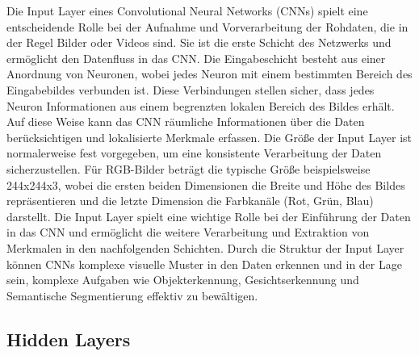     Die Input Layer eines Convolutional Neural Networks (CNNs) spielt eine entscheidende Rolle bei der Aufnahme und Vorverarbeitung der Rohdaten, die in der Regel Bilder oder Videos sind. 
    Sie ist die erste Schicht des Netzwerks und ermöglicht den Datenfluss in das CNN.
    Die Eingabeschicht besteht aus einer Anordnung von Neuronen, wobei jedes Neuron mit einem bestimmten Bereich des Eingabebildes verbunden ist. 
    Diese Verbindungen stellen sicher, dass jedes Neuron Informationen aus einem begrenzten lokalen Bereich des Bildes erhält. Auf diese Weise kann das CNN räumliche Informationen über die Daten berücksichtigen und lokalisierte Merkmale erfassen.
    Die Größe der Input Layer ist normalerweise fest vorgegeben, um eine konsistente Verarbeitung der Daten sicherzustellen. 
    Für RGB-Bilder beträgt die typische Größe beispielsweise 244x244x3, wobei die ersten beiden Dimensionen die Breite und Höhe des Bildes repräsentieren und die letzte Dimension die Farbkanäle (Rot, Grün, Blau) darstellt.
    Die Input Layer spielt eine wichtige Rolle bei der Einführung der Daten in das CNN und ermöglicht die weitere Verarbeitung und Extraktion von Merkmalen in den nachfolgenden Schichten. 
    Durch die Struktur der Input Layer können CNNs komplexe visuelle Muster in den Daten erkennen und in der Lage sein, komplexe Aufgaben wie Objekterkennung, Gesichtserkennung und Semantische Segmentierung effektiv zu bewältigen.

\subsection{Hidden Layers}

    
